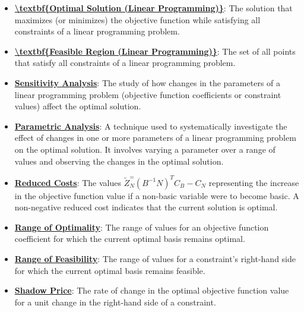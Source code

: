 \documentclass{article}%
\begin{document}
\begin{itemize}[leftmargin=*]
\item \href{https://www.math.purdue.edu/~yipn/421/2024-09-24-SimplexMatrix.pdf#page=16}{\textbf{\textbackslash{}textbf\{Optimal Solution (Linear Programming)\}}}: The solution that maximizes (or minimizes) the objective function while satisfying all constraints of a linear programming problem.%
\item \href{https://www.math.purdue.edu/~yipn/421/2024-09-24-SimplexMatrix.pdf#page=16}{\textbf{\textbackslash{}textbf\{Feasible Region (Linear Programming)\}}}: The set of all points that satisfy all constraints of a linear programming problem.%
\end{itemize}%
\begin{itemize}[leftmargin=*]%
\item \href{https://www.math.purdue.edu/~yipn/421/2024-09-26-Sensitivity.pdf#page=7}{\textbf{Sensitivity Analysis}}: The study of how changes in the parameters of a linear programming problem (objective function coefficients or constraint values) affect the optimal solution.%
\item \href{https://www.math.purdue.edu/~yipn/421/2024-09-26-Sensitivity.pdf#page=4}{\textbf{Parametric Analysis}}: A technique used to systematically investigate the effect of changes in one or more parameters of a linear programming problem on the optimal solution. It involves varying a parameter over a range of values and observing the changes in the optimal solution.%
\item \href{https://www.math.purdue.edu/~yipn/421/2024-09-26-Sensitivity.pdf#page=7}{\textbf{Reduced Costs}}: The values $\tilde{Z}_N^ = (B^{-1} N)^T C_B - C_N$ representing the increase in the objective function value if a non-basic variable were to become basic. A non-negative reduced cost indicates that the current solution is optimal.%
\item \href{https://www.math.purdue.edu/~yipn/421/2024-09-26-Sensitivity.pdf#page=4}{\textbf{Range of Optimality}}: The range of values for an objective function coefficient for which the current optimal basis remains optimal.%
\item \href{https://www.math.purdue.edu/~yipn/421/2024-09-26-Sensitivity.pdf#page=8}{\textbf{Range of Feasibility}}: The range of values for a constraint's right-hand side for which the current optimal basis remains feasible.%
\end{itemize}%
\begin{itemize}[leftmargin=*]%
\item \href{https://www.math.purdue.edu/~yipn/421/2024-10-01-SensitivityDuality.pdf#page=10}{\textbf{Shadow Price}}: The rate of change in the optimal objective function value for a unit change in the right-hand side of a constraint.%
\end{itemize}%
\end{document}
